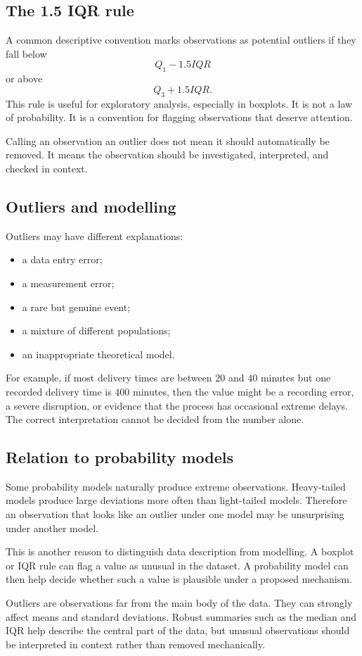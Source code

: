 \subsection*{The 1.5 IQR rule}

A common descriptive convention marks observations as potential outliers if they
fall below
\[
Q_1-1.5IQR
\]
or above
\[
Q_3+1.5IQR.
\]
This rule is useful for exploratory analysis, especially in boxplots. It is not a
law of probability. It is a convention for flagging observations that deserve
attention.

\begin{remarkbox}
Calling an observation an outlier does not mean it should automatically be
removed. It means the observation should be investigated, interpreted, and
checked in context.
\end{remarkbox}

\subsection*{Outliers and modelling}

Outliers may have different explanations:
\begin{itemize}
    \item a data entry error;
    \item a measurement error;
    \item a rare but genuine event;
    \item a mixture of different populations;
    \item an inappropriate theoretical model.
\end{itemize}

For example, if most delivery times are between \(20\) and \(40\) minutes but one
recorded delivery time is \(400\) minutes, then the value might be a recording
error, a severe disruption, or evidence that the process has occasional extreme
delays. The correct interpretation cannot be decided from the number alone.

\subsection*{Relation to probability models}

Some probability models naturally produce extreme observations. Heavy-tailed
models produce large deviations more often than light-tailed models. Therefore an
observation that looks like an outlier under one model may be unsurprising under
another model.

This is another reason to distinguish data description from modelling. A boxplot
or IQR rule can flag a value as unusual in the dataset. A probability model can
then help decide whether such a value is plausible under a proposed mechanism.

\begin{summarybox}
Outliers are observations far from the main body of the data. They can strongly
affect means and standard deviations. Robust summaries such as the median and IQR
help describe the central part of the data, but unusual observations should be
interpreted in context rather than removed mechanically.
\end{summarybox}
